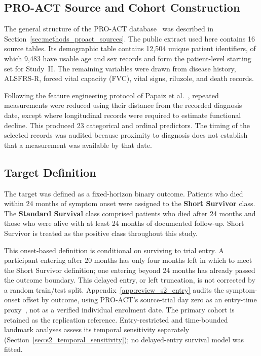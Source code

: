 \subsection{PRO-ACT Source and Cohort Construction}
\label{subsec:s2_proact}

The general structure of the PRO-ACT database~\cite{PROACT} was described in Section~\ref{sec:methods_proact_sources}. The public extract used here contains 16 source tables. Its demographic table contains 12,504 unique patient identifiers, of which 9,483 have usable age and sex records and form the patient-level starting set for Study~II. The remaining variables were drawn from disease history, ALSFRS-R, forced vital capacity (FVC), vital signs, riluzole, and death records.

Following the feature engineering protocol of Papaiz et al.~\cite{Papaiz2024}, repeated measurements were reduced using their distance from the recorded diagnosis date, except where longitudinal records were required to estimate functional decline. This produced 23 categorical and ordinal predictors. The timing of the selected records was audited because proximity to diagnosis does not establish that a measurement was available by that date.

\subsection{Target Definition}
\label{subsec:s2_target}

The target was defined as a fixed-horizon binary outcome. Patients who died within 24 months of symptom onset were assigned to the \textbf{Short Survivor} class. The \textbf{Standard Survival} class comprised patients who died after 24 months and those who were alive with at least 24 months of documented follow-up. Short Survivor is treated as the positive class throughout this study.

This onset-based definition is conditional on surviving to trial entry. A participant entering after 20 months has only four months left in which to meet the Short Survivor definition; one entering beyond 24 months has already passed the outcome boundary. This delayed entry, or left truncation, is not corrected by a random train/test split. Appendix~\ref{app:review_s2_entry} audits the symptom-onset offset by outcome, using PRO-ACT's source-trial day zero as an entry-time proxy~\cite{PROACTtiming}, not as a verified individual enrolment date. The primary cohort is retained as the replication reference. Entry-restricted and time-bounded landmark analyses assess its temporal sensitivity separately (Section~\ref{sec:s2_temporal_sensitivity}); no delayed-entry survival model was fitted.

